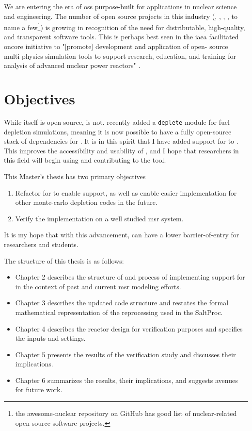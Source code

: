     We are entering the era of \Gls{oss} purpose-built for applications in nuclear science and engineering. The number of open source projects in this industry (\ONIX\cite{de_troullioud_de_lanversin_onix_2021}, \OpenMC, \NJOYTWOONE\cite{noauthor_njoy21_2022}, \Cyclus\cite{noauthor_cyclus_2022}, to name a few\footnote{the awesome-nuclear repository on GitHub \cite{romano_awesome_2022} has good list of nuclear-related open source software projects.}) is growing in recognition of the need for
    distributable, high-quality, and transparent software tools. This is perhaps best seen in the \Gls{iaea} facilitated \Gls{oncore} initiative \cite{fiorina_initiative_2021} to "[promote] development and application of open- source multi-physics simulation tools to support research, education, and training for analysis of advanced nuclear power reactors"  \cite{iaea_open-source_2022}. 


\section{Objectives}%
\label{sec:objectives}

While \SaltProc itself is open source, \SerpentTWO is not. \OpenMC recently added a \verb.deplete. module for fuel depletion simulations, meaning it is now possible to have a fully open-source stack of dependencies for \SaltProc.  It is in this spirit that I have added support for \OpenMC to \SaltProc. This improves the accessibility and usability of \SaltProc, and I hope that researchers in this field will begin using and contributing to the tool.

This Master's thesis has two primary objectives
\begin{enumerate}
    \item Refactor \SaltProc for to enable \OpenMC support, as well as enable easier implementation for other monte-carlo depletion codes in the future. 
    \item Verify the implementation on a well studied \Gls{msr} system.
\end{enumerate}

It is my hope that with this advancement, \SaltProc can have a lower barrier-of-entry for researchers and students. 

The structure of this thesis is as follows:
\begin{itemize}
    \item Chapter 2 describes the structure of \SaltProc and process of implementing support for \OpenMC in the context of past and current \Gls{msr} modeling efforts.
    \item Chapter 3 describes the updated code structure and restates the formal mathematical representation of the reprocessing used in the SaltProc.
    \item Chapter 4 describes the reactor design for verification purposes and specifies the inputs and settings.
    \item Chapter 5 presents the results of the verification study and discusses their implications.
    \item Chapter 6 summarizes the results, their implications, and suggests avenues for future work.
\end{itemize}


